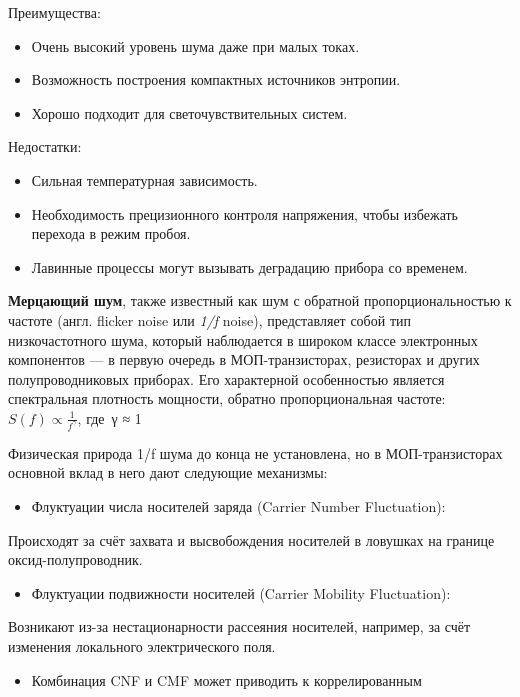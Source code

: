 Преимущества:

\begin{itemize}
\item
  Очень высокий уровень шума даже при малых токах.
\item
  Возможность построения компактных источников энтропии.
\item
  Хорошо подходит для светочувствительных систем.
\end{itemize}

Недостатки:

\begin{itemize}
\item
  Сильная температурная зависимость.
\item
  Необходимость прецизионного контроля напряжения, чтобы избежать
  перехода в режим пробоя.
\item
  Лавинные процессы могут вызывать деградацию прибора со временем.
\end{itemize}

\textbf{Мерцающий шум}, также известный как шум с обратной
пропорциональностью к частоте (англ. flicker noise или \emph{1/f}
noise), представляет собой тип низкочастотного шума, который наблюдается
в широком классе электронных компонентов --- в первую очередь в
МОП-транзисторах, резисторах и других полупроводниковых приборах. Его
характерной особенностью является спектральная плотность мощности,
обратно пропорциональная частоте: \(S(f) \propto \frac{1}{f^{\gamma}}\),
где~γ ≈ 1

Физическая природа 1/f шума до конца не установлена, но в
МОП-транзисторах основной вклад в него дают следующие механизмы:

\begin{itemize}
\item
  Флуктуации числа носителей заряда (Carrier Number Fluctuation):
\end{itemize}

Происходят за счёт захвата и высвобождения носителей в ловушках на
границе оксид-полупроводник.

\begin{itemize}
\item
  Флуктуации подвижности носителей (Carrier Mobility Fluctuation):
\end{itemize}

Возникают из-за нестационарности рассеяния носителей, например, за счёт
изменения локального электрического поля.

\begin{itemize}
\item
  Комбинация CNF и CMF может приводить к коррелированным
\end{itemize}

